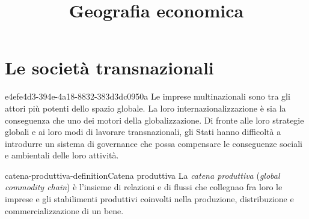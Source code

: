 \documentclass[preview]{standalone}
\begin{document}
\title{Geografia economica}
\genpage

\section{Le società transnazionali}

\begin{snippet}{e4efe4d3-394e-4a18-8832-383d3dc0950a}
    Le imprese multinazionali sono tra gli attori più potenti dello spazio globale. La loro
    internazionalizzazione è sia la conseguenza che uno dei motori della globalizzazione. Di fronte alle loro
    strategie globali e ai loro modi di lavorare transnazionali, gli Stati hanno difficoltà a introdurre un
    sistema di governance che possa compensare le conseguenze sociali e ambientali delle loro attività.
\end{snippet}


\begin{snippetdefinition}{catena-produttiva-definition}{Catena produttiva}
    La \textit{catena produttiva} (\textit{global commodity chain}) è l'insieme di relazioni e di flussi che collegnao
    fra loro le imprese e gli stabilimenti produttivi coinvolti nella 
    produzione, distribuzione e commercializzazione di un bene.
\end{snippetdefinition}
\end{document}
